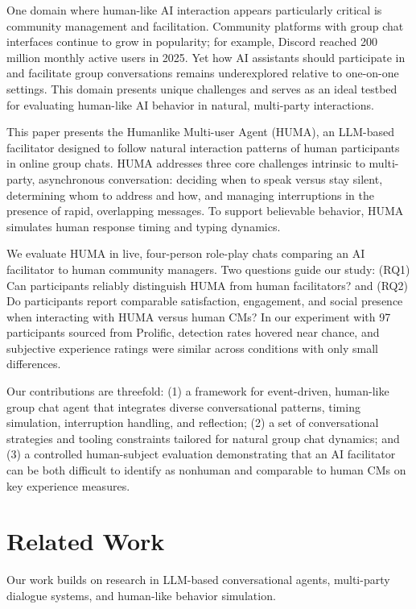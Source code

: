 \documentclass[twocolumn,10pt]{article}
\begin{document}
One domain where human-like AI interaction appears particularly critical is community management and facilitation. Community platforms with group chat interfaces continue to grow in popularity; for example, Discord reached 200 million monthly active users in 2025. Yet how AI assistants should participate in and facilitate group conversations remains underexplored relative to one-on-one settings. This domain presents unique challenges and serves as an ideal testbed for evaluating human-like AI behavior in natural, multi-party interactions.

This paper presents the Humanlike Multi-user Agent (HUMA), an LLM-based facilitator designed to follow natural interaction patterns of human participants in online group chats. HUMA addresses three core challenges intrinsic to multi-party, asynchronous conversation: deciding when to speak versus stay silent, determining whom to address and how, and managing interruptions in the presence of rapid, overlapping messages. To support believable behavior, HUMA simulates human response timing and typing dynamics.


We evaluate HUMA in live, four-person role-play chats comparing an AI facilitator to human community managers. Two questions guide our study: (RQ1) Can participants reliably distinguish HUMA from human facilitators? and (RQ2) Do participants report comparable satisfaction, engagement, and social presence when interacting with HUMA versus human CMs? In our experiment with 97 participants sourced from Prolific, detection rates hovered near chance, and subjective experience ratings were similar across conditions with only small differences.

Our contributions are threefold: (1) a framework for event-driven, human-like group chat agent that integrates diverse conversational patterns, timing simulation, interruption handling, and reflection; (2) a set of conversational strategies and tooling constraints tailored for natural group chat dynamics; and (3) a controlled human-subject evaluation demonstrating that an AI facilitator can be both difficult to identify as nonhuman and comparable to human CMs on key experience measures.

\section{Related Work}
\label{sec:related}

Our work builds on research in LLM-based conversational agents, multi-party dialogue systems, and human-like behavior simulation.
\end{document}
